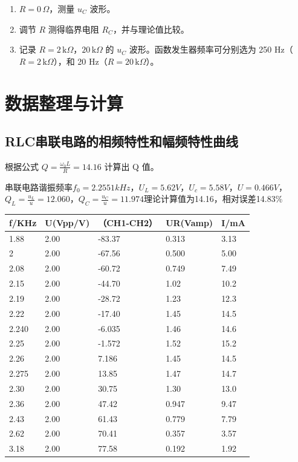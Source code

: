 \documentclass[zihao=5, UTF8]{article}
\theoremstyle{MyLineTheoremStyle} %
\theoremstyle{MyBlockTheoremStyle} %
\theoremstyle{MySubsubsectionStyle} %
\begin{document}
\begin{enumerate}
    \item \( R = 0 \, \Omega \)，测量 \( u_C \) 波形。
    \item 调节 \( R \) 测得临界电阻 \( R_C \)，并与理论值比较。
    \item 记录 \( R = 2 \, \text{k}\Omega \)，\( 20 \, \text{k}\Omega \) 的 \( u_C \) 波形。函数发生器频率可分别选为 250 Hz（\( R = 2 \, \text{k}\Omega \)），和 20 Hz（\( R = 20 \, \text{k}\Omega \)）。
\end{enumerate}


\section{数据整理与计算}

\subsection{RLC串联电路的相频特性和幅频特性曲线}

根据公式 \( Q = \frac{\omega_0 L}{R} = 14.16 \) 计算出 Q 值。

串联电路谐振频率$f_0=2.2551kHz$，$U_L=5.62V$，$U_c=5.58V$，$U=0.466V$，$Q_L=\frac{u_L}{u} = 12.060$，$Q_C = \frac{u_C}{u} = 11.974$理论计算值为14.16，相对误差14.83\%
\begin{table}[H]
  \centering
	\begin{tabular}{|l|l|l|l|l|}
		\hline
		f/KHz & U(Vpp/V) & （CH1-CH2） & UR(Vamp) & I/mA   \\ \hline
		1.88  & 2.00     & -83.37    & 0.313    & 3.13  \\ \hline
		2     & 2.00     & -67.56    & 0.500    & 5.00  \\ \hline
		2.08  & 2.00     & -60.72    & 0.749     & 7.49  \\ \hline
		2.15  & 2.00     & -44.70    & 1.02    & 10.2  \\ \hline
		2.19  & 2.00     & -28.72    & 1.23    & 12.3  \\ \hline
		2.22  & 2.00     & -17.40     & 1.45     & 14.5 \\ \hline
		2.240 & 2.00     & -6.035    & 1.46    & 14.6  \\ \hline
		2.25  & 2.00     & -1.572      & 1.52    & 15.2 \\ \hline
		2.26  & 2.00     & 7.186     & 1.45    & 14.5  \\ \hline
		2.275 & 2.00     & 13.85     & 1.47    & 14.7 \\ \hline
		2.30  & 2.00     & 30.75     & 1.30    & 13.0 \\ \hline
		2.36  & 2.00     & 47.42     & 0.947    & 9.47  \\ \hline
		2.43  & 2.00     & 61.43     & 0.779    & 7.79  \\ \hline
		2.62  & 2.00     & 70.41     & 0.357    & 3.57  \\ \hline
		3.18  & 2.00     & 77.58     & 0.192    & 1.92  \\ \hline
	\end{tabular}
\end{table}
\end{document}
